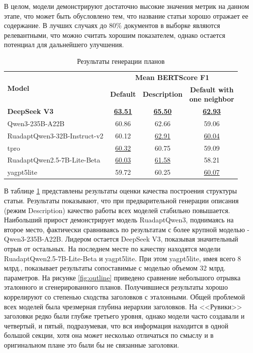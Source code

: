 \documentclass{article}
\begin{document}
В целом, модели демонстрируют достаточно высокие значения метрик на данном этапе, что может быть обусловлено тем, что название статьи хорошо отражает ее содержание. 
В лучших случаях до 80\% документов в выборке являются релевантными, что можно считать хорошим показателем, однако остается потенциал для дальнейшего улучшения.

\begin{table}[ht!]
\centering
\caption{Результаты генерации планов}
\begin{tabular}{l|c|c|c}
\hline
\multirow{2}{*}{\textbf{Model}} & \multicolumn{3}{c}{\textbf{Mean BERTScore F1}} \\
\cline{2-4}
 & \textbf{Default} & \textbf{Description} & \makecell{\textbf{Default with} \\ \textbf{one neighbor}} \\
\hline
\textbf{DeepSeek V3}                                             & \uline{\textbf{63.51}} & \uline{\textbf{65.50}} & \uline{\textbf{62.93}} \\
Qwen3-\allowbreak 235B-\allowbreak A22B                          & 60.86 & 62.66 & 59.06 \\
\hline
RuadaptQwen3-\allowbreak 32B-\allowbreak Instruct-\allowbreak v2 & 60.12 & \uline{62.91} & \uline{60.04} \\
tpro                                                             & \uline{60.32} & 60.75 & 59.09 \\
\hline
RuadaptQwen2.5-7B-\allowbreak Lite-\allowbreak Beta              & \uline{60.03} & \uline{61.58} & 58.21 \\
yagpt5lite                                                       & 59.72 & 60.25 & \uline{60.07} \\
\hline
\end{tabular}
\label{tab:outline_res}
\end{table}

В таблице \ref{tab:outline_res} представлены результаты оценки качества построения структуры статьи. Результаты показывают, что при предварительной генерации описания (режим Description) 
качество работы всех моделей стабильно повышается. 
Наибольший прирост демонстрирует модель RuadaptQwen3, поднимаясь на второе место, фактически сравниваясь по результатам с более крупной моделью
- Qwen3-\allowbreak 235B-\allowbreak A22B. Лидером остается DeepSeek V3, показывая значительный отрыв от остальных. На последнем месте по качеству находятся модели RuadaptQwen2.5-7B-\allowbreak Lite-\allowbreak Beta и yagpt5lite.
При этом yagpt5lite, имея всего 8 млрд., показывает результаты сопоставимые с моделью объемом 32 млрд. параметров.
На рисунке \ref{fig:outline} приведено сравнение небольшого отрывка эталонного и сгенерированного планов.
Получившиеся результаты хорошо коррелируют со степенью сходства заголовков с эталонными. Общей проблемой всех моделей была чрезмерная глубина иерархии заголовков.
На <<Рувики>> заголовки редко были глубже третьего уровня, однако модели часто создавали и четвертый, и пятый, подразумевая, что вся информация находится в одной большой секции, хотя
она может несколько отличаться по смыслу и в оригинальном плане это были бы не связанные заголовки.
\end{document}
